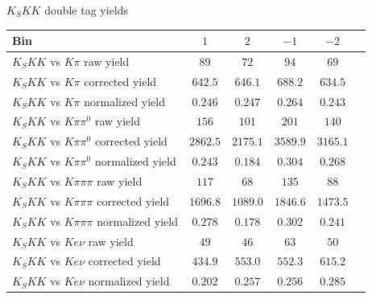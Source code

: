 \documentclass{beamer}
\begin{document}
\begin{frame}{$K_SKK$ double tag yields}
  \centering
  \def\arraystretch{1.2}%
  \begin{tabular}{l|ccccc}
    Bin                                        & $1$      & $2$      & $-1$     & $-2$ \\
    \hline
    $K_SKK$ vs $K\pi$ raw yield                & $89$     & $72$     & $94$     & $69$ \\
    $K_SKK$ vs $K\pi$ corrected yield          & $642.5$  & $646.1$  & $688.2$  & $634.5$ \\
    $K_SKK$ vs $K\pi$ normalized yield         & $0.246$  & $0.247$  & $0.264$  & $0.243$ \\
    \hline
    $K_SKK$ vs $K\pi\pi^0$ raw yield           & $156$    & $101$    & $201$    & $140$ \\
    $K_SKK$ vs $K\pi\pi^0$ corrected yield     & $2862.5$ & $2175.1$ & $3589.9$ & $3165.1$ \\
    $K_SKK$ vs $K\pi\pi^0$ normalized yield    & $0.243$  & $0.184$  & $0.304$  & $0.268$ \\
    \hline
    $K_SKK$ vs $K\pi\pi\pi$ raw yield          & $117$    & $68$     & $135$    & $88$ \\
    $K_SKK$ vs $K\pi\pi\pi$ corrected yield    & $1696.8$ & $1089.0$ & $1846.6$ & $1473.5$ \\
    $K_SKK$ vs $K\pi\pi\pi$ normalized yield   & $0.278$  & $0.178$  & $0.302$  & $0.241$ \\
    \hline
    $K_SKK$ vs $Ke\nu$ raw yield               & $49$     & $46$     & $63$     & $50$ \\
    $K_SKK$ vs $Ke\nu$ corrected yield         & $434.9$  & $553.0$  & $552.3$  & $615.2$ \\
    $K_SKK$ vs $Ke\nu$ normalized yield        & $0.202$  & $0.257$  & $0.256$  & $0.285$ \\
    \hline
  \end{tabular}
\end{frame}
\end{document}
